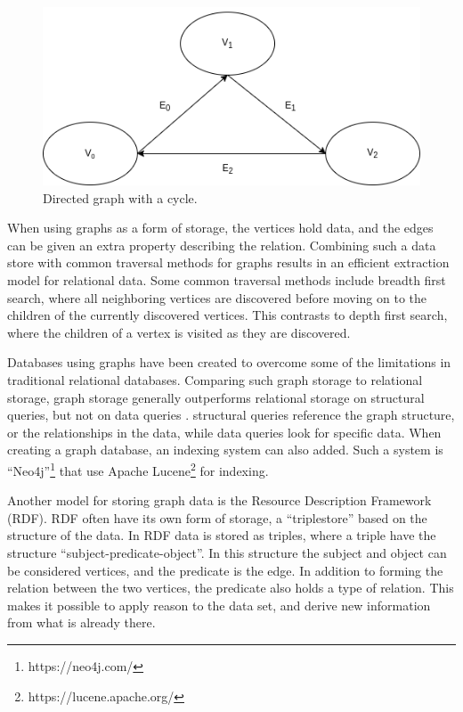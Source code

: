\begin{figure}[h]
    \centering
    \includegraphics[scale=0.5]{figs/triangleDG.png}
    \caption{Directed graph with a cycle.}
    \label{fig:DAGvsDG}
\end{figure}

When using graphs as a form of storage, the vertices hold data, and the edges can be given an extra property describing the relation. Combining such a data store with common traversal methods for graphs results in an efficient extraction model for relational data. Some common traversal methods include breadth first search, where all neighboring vertices are discovered before moving on to the children of the currently discovered vertices. This contrasts to depth first search, where the children of a vertex is visited as they are discovered.

Databases using graphs have been created to overcome some of the limitations in traditional relational databases. Comparing such graph storage to relational storage, graph storage generally outperforms relational storage on structural queries, but not on data queries \cite{AComparisonOfGraphAndRelDB}. structural queries reference the graph structure, or the relationships in the data, while data queries look for specific data. When creating a graph database, an indexing system can also added. Such a system is ``Neo4j''\footnote{https://neo4j.com/} that use Apache Lucene\footnote{https://lucene.apache.org/} for indexing.

Another model for storing graph data is the Resource Description Framework (RDF). RDF often have its own form of storage, a ``triplestore'' based on the structure of the data. In RDF data is stored as triples, where a triple have the structure ``subject-predicate-object''. In this structure the subject and object can be considered vertices, and the predicate is the edge. In addition to forming the relation between the two vertices, the predicate also holds a type of relation. This makes it possible to apply reason to the data set, and derive new information from what is already there.

